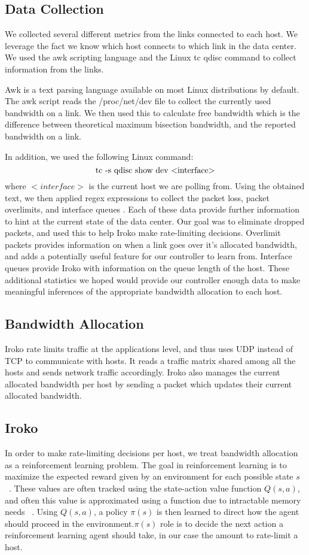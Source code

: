 \subsection{Data Collection }
We collected several different metrics from the links connected to each host. We leverage the fact we know which host connects to which link in the data center. We used the awk scripting language and the Linux tc qdisc command to collect information from the links. 

Awk is a text parsing language available on most Linux distributions by default. The awk script reads the /proc/net/dev file to collect the currently used  bandwidth on a link. We then used this to calculate free bandwidth which is the difference between theoretical maximum bisection bandwidth, and the reported bandwidth on a link.

In addition, we used the following Linux command:
\[$tc -s qdisc show dev <interface>$ \] 
where $<interface>$ is the current host we are polling from. Using the obtained text, we then applied regex expressions to collect the packet loss, packet overlimits, and interface queues . Each of these data provide further information to hint at the current state of the data center. Our goal was to eliminate dropped packets, and used this to help Iroko make rate-limiting decisions. Overlimit packets provides information on when a link goes over it’s allocated bandwidth, and adds a potentially useful feature for our controller to learn from. Interface queues provide Iroko with information on the queue length of the host.  These additional statistics we hoped would provide our controller enough data to make meaningful inferences of the appropriate bandwidth allocation to each host. 

\subsection{Bandwidth Allocation}
Iroko rate limits traffic at the applications level, and thus uses UDP instead of TCP to communicate with hosts. It reads a traffic matrix shared among all the hosts and sends network traffic accordingly. Iroko also manages the current allocated bandwidth per host by sending a packet which updates their current allocated bandwidth.


\subsection{Iroko}

In order to make rate-limiting decisions per host, we treat bandwidth allocation as a reinforcement learning problem. The goal in reinforcement learning is to maximize the expected reward given by an environment for each possible state $s$ ~\cite{Sutton:1998:IRL:551283}. These values are often tracked using the state-action value function $Q(s,a)$, and often this value is approximated using a function due to intractable memory needs ~\cite{Sutton:1998:IRL:551283}. Using $Q(s,a)$, a policy $\pi(s)$ is then learned to direct how the agent should proceed in the environment.$\pi(s)$ role is to decide the next action a reinforcement learning agent should take, in our case the amount to rate-limit a host. 
 

